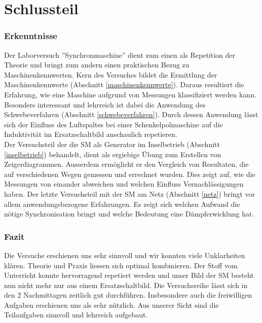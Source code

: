 \part{Schlussteil}



\section{Erkenntnisse}
Der Laborversuch ''Synchronmaschine'' dient zum einen als Repetition der Theorie und bringt zum andern einen praktischen Bezug zu Maschinenkennwerten. Kern des Versuches bildet die Ermittlung der Maschinenkennwerte (Abschnitt \ref{maschinenkennwerte}). Daraus resultiert die Erfahrung, wie eine Maschine aufgrund von Messungen klassifiziert werden kann. Besonders interessant und lehrreich ist dabei die Anwendung des Schwebeverfahren (Abschnitt \ref{schwebeverfahren}). Durch dessen Anwendung lässt sich der Einfluss des Luftspaltes bei einer Schenkelpolmaschine auf die Induktivität im Ersatzschaltbild anschaulich repetieren.\\
Der Versuchsteil der die SM als Generator im Inselbetrieb (Abschnitt \ref{inselbetrieb}) behandelt, dient als ergiebige Übung zum Erstellen von Zeigerdiagrammen. Ausserdem ermöglicht er den Vergleich von Resultaten, die auf verschiedenen Wegen gemessen und errechnet wurden. Dies zeigt auf, wie die Messungen von einander abweichen und welchen Einfluss Vernachlässigungen haben. Der letzte Versuchsteil mit der SM am Netz (Abschnitt \ref{netz}) bringt vor allem anwendungsbezogene Erfahrungen. Es zeigt sich welchen Aufwand die nötige Synchronisation bringt und welche Bedeutung eine Dämpferwicklung hat.   


\section{Fazit} %
Die Versuche erschienen uns sehr sinnvoll und wir konnten viele Unklarheiten  klären. Theorie und Praxis liessen sich optimal kombinieren. Der Stoff vom Unterricht konnte hervorragend repetiert werden und unser Bild der SM besteht nun nicht mehr nur aus einem Ersatzschaltbild. Die Versuchsreihe lässt sich in den 2 Nachmittagen zeitlich gut durchführen. Insbesondere auch die freiwilligen Aufgaben erschienen uns als sehr nützlich. Aus unserer Sicht sind die Teilaufgaben sinnvoll und lehrreich aufgebaut.




